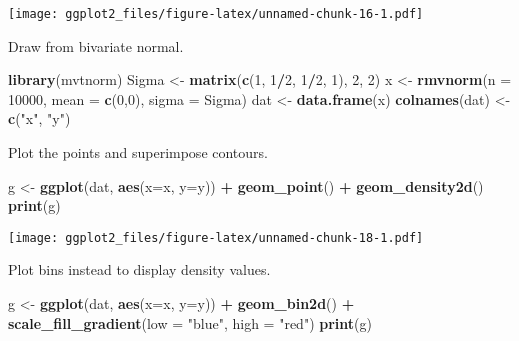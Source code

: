 \documentclass[]{article}
\newenvironment{Shaded}{\begin{snugshade}}{\end{snugshade}}
\newcommand{\KeywordTok}[1]{\textcolor[rgb]{0.13,0.29,0.53}{\textbf{#1}}}
\newcommand{\DataTypeTok}[1]{\textcolor[rgb]{0.13,0.29,0.53}{#1}}
\newcommand{\DecValTok}[1]{\textcolor[rgb]{0.00,0.00,0.81}{#1}}
\newcommand{\StringTok}[1]{\textcolor[rgb]{0.31,0.60,0.02}{#1}}
\newcommand{\OperatorTok}[1]{\textcolor[rgb]{0.81,0.36,0.00}{\textbf{#1}}}
\newcommand{\NormalTok}[1]{#1}
\begin{document}
\texttt{[image: ggplot2\_files/figure-latex/unnamed-chunk-16-1.pdf]}

Draw from bivariate normal.

\begin{Shaded}
\begin{Highlighting}[]
\KeywordTok{library}\NormalTok{(mvtnorm)}
\NormalTok{Sigma <-}\StringTok{ }\KeywordTok{matrix}\NormalTok{(}\KeywordTok{c}\NormalTok{(}\DecValTok{1}\NormalTok{, }\DecValTok{1}\OperatorTok{/}\DecValTok{2}\NormalTok{, }\DecValTok{1}\OperatorTok{/}\DecValTok{2}\NormalTok{, }\DecValTok{1}\NormalTok{), }\DecValTok{2}\NormalTok{, }\DecValTok{2}\NormalTok{)}
\NormalTok{x <-}\StringTok{ }\KeywordTok{rmvnorm}\NormalTok{(}\DataTypeTok{n =} \DecValTok{10000}\NormalTok{, }\DataTypeTok{mean =} \KeywordTok{c}\NormalTok{(}\DecValTok{0}\NormalTok{,}\DecValTok{0}\NormalTok{), }\DataTypeTok{sigma =}\NormalTok{ Sigma)}
\NormalTok{dat <-}\StringTok{ }\KeywordTok{data.frame}\NormalTok{(x)}
\KeywordTok{colnames}\NormalTok{(dat) <-}\StringTok{ }\KeywordTok{c}\NormalTok{(}\StringTok{"x"}\NormalTok{, }\StringTok{"y"}\NormalTok{)}
\end{Highlighting}
\end{Shaded}

Plot the points and superimpose contours.

\begin{Shaded}
\begin{Highlighting}[]
\NormalTok{g <-}\StringTok{ }\KeywordTok{ggplot}\NormalTok{(dat, }\KeywordTok{aes}\NormalTok{(}\DataTypeTok{x=}\NormalTok{x, }\DataTypeTok{y=}\NormalTok{y)) }\OperatorTok{+}
\StringTok{    }\KeywordTok{geom_point}\NormalTok{() }\OperatorTok{+}
\StringTok{    }\KeywordTok{geom_density2d}\NormalTok{()}
\KeywordTok{print}\NormalTok{(g)}
\end{Highlighting}
\end{Shaded}

\texttt{[image: ggplot2\_files/figure-latex/unnamed-chunk-18-1.pdf]}

Plot bins instead to display density values.

\begin{Shaded}
\begin{Highlighting}[]
\NormalTok{g <-}\StringTok{ }\KeywordTok{ggplot}\NormalTok{(dat, }\KeywordTok{aes}\NormalTok{(}\DataTypeTok{x=}\NormalTok{x, }\DataTypeTok{y=}\NormalTok{y)) }\OperatorTok{+}
\StringTok{    }\KeywordTok{geom_bin2d}\NormalTok{() }\OperatorTok{+}
\StringTok{    }\KeywordTok{scale_fill_gradient}\NormalTok{(}\DataTypeTok{low =} \StringTok{"blue"}\NormalTok{, }\DataTypeTok{high =} \StringTok{"red"}\NormalTok{)}
\KeywordTok{print}\NormalTok{(g)}
\end{Highlighting}
\end{Shaded}
\end{document}

